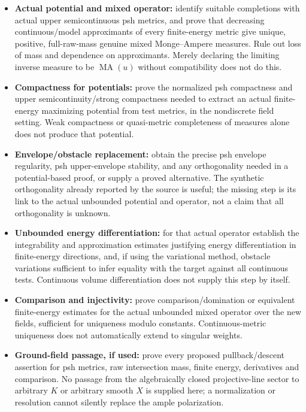 \documentclass[
  11pt,
]{article}
\providecommand{\tightlist}{%
  \setlength{\itemsep}{0pt}\setlength{\parskip}{0pt}}
\begin{document}
\begin{itemize}
\tightlist
\item
  \textbf{Actual potential and mixed operator:} identify suitable
  completions with actual upper semicontinuous psh metrics, and prove
  that decreasing continuous/model approximants of every finite-energy
  metric give unique, positive, full-raw-mass genuine mixed
  Monge--Ampere measures. Rule out loss of mass and dependence on
  approximants. Merely declaring the limiting inverse measure to be
  \(\operatorname{MA}(u)\) without compatibility does not do this.
\item
  \textbf{Compactness for potentials:} prove the normalized psh
  compactness and upper semicontinuity/strong compactness needed to
  extract an actual finite-energy maximizing potential from test
  metrics, in the nondiscrete field setting. Weak compactness or
  quasi-metric completeness of measures alone does not produce that
  potential.
\item
  \textbf{Envelope/obstacle replacement:} obtain the precise psh
  envelope regularity, psh upper-envelope stability, and any
  orthogonality needed in a potential-based proof, or supply a proved
  alternative. The synthetic orthogonality already reported by the
  source is useful; the missing step is its link to the actual unbounded
  potential and operator, not a claim that all orthogonality is unknown.
\item
  \textbf{Unbounded energy differentiation:} for that actual operator
  establish the integrability and approximation estimates justifying
  energy differentiation in finite-energy directions, and, if using the
  variational method, obstacle variations sufficient to infer equality
  with the target against all continuous tests. Continuous volume
  differentiation does not supply this step by itself.
\item
  \textbf{Comparison and injectivity:} prove comparison/domination or
  equivalent finite-energy estimates for the actual unbounded mixed
  operator over the new fields, sufficient for uniqueness modulo
  constants. Continuous-metric uniqueness does not automatically extend
  to singular weights.
\item
  \textbf{Ground-field passage, if used:} prove every proposed
  pullback/descent assertion for psh metrics, raw intersection mass,
  finite energy, derivatives and comparison. No passage from the
  algebraically closed projective-line sector to arbitrary \(K\) or
  arbitrary smooth \(X\) is supplied here; a normalization or resolution
  cannot silently replace the ample polarization.
\end{itemize}
\end{document}
